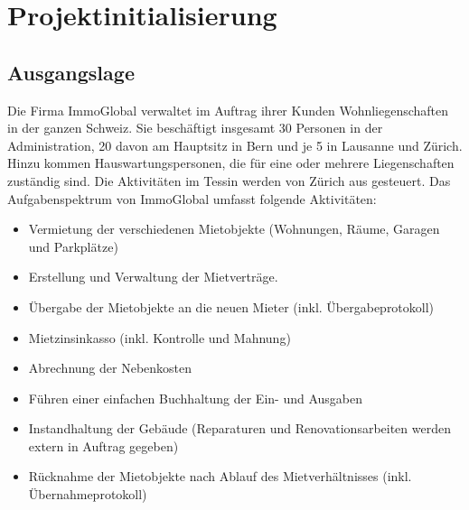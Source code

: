 \section{Projektinitialisierung}
\subsection{Ausgangslage}

Die Firma ImmoGlobal verwaltet im Auftrag ihrer Kunden Wohnliegenschaften in der ganzen Schweiz. Sie beschäftigt insgesamt 30 Personen in der Administration, 20 davon am Hauptsitz in Bern und je 5 in Lausanne und Zürich. Hinzu kommen Hauswartungspersonen, die für eine oder mehrere Liegenschaften zuständig sind. Die Aktivitäten im Tessin werden von Zürich aus gesteuert.
Das Aufgabenspektrum von ImmoGlobal umfasst folgende Aktivitäten:
\begin{itemize}
  \item Vermietung der verschiedenen Mietobjekte (Wohnungen, Räume, Garagen und Parkplätze)
  \item Erstellung und Verwaltung der Mietverträge.
  \item Übergabe der Mietobjekte an die neuen Mieter (inkl. Übergabeprotokoll)
  \item Mietzinsinkasso (inkl. Kontrolle und Mahnung)
  \item Abrechnung der Nebenkosten
  \item Führen einer einfachen Buchhaltung der Ein- und Ausgaben
  \item Instandhaltung der Gebäude (Reparaturen und Renovationsarbeiten werden extern in Auftrag gegeben)
  \item Rücknahme der Mietobjekte nach Ablauf des Mietverhältnisses (inkl. Übernahmeprotokoll)
\end{itemize}

